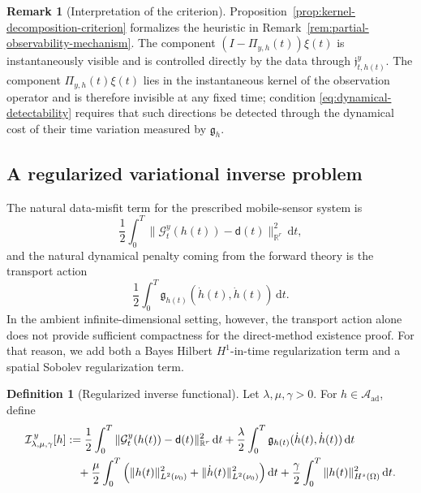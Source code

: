 \documentclass{article}
\theoremstyle{definition}
\newtheorem{definition}[theorem]{Definition}
\newtheorem{remark}[theorem]{Remark}
\renewcommand{\d}{\mathrm{d}}
\newcommand{\obsdata}{\mathsf{d}}
\begin{document}
\begin{remark}[Interpretation of the criterion]
    \label{rem:kernel-decomposition-criterion}
    Proposition~\ref{prop:kernel-decomposition-criterion} formalizes the heuristic in
    Remark~\ref{rem:partial-observability-mechanism}. The component
    \((I-\Pi_{y,h}(t))\xi(t)\) is instantaneously visible and is controlled directly by the data through
    \(\mathfrak j_{t,h(t)}^{y}\). The component \(\Pi_{y,h}(t)\xi(t)\) lies in the instantaneous kernel
    of the observation operator and is therefore invisible at any fixed time; condition
    \eqref{eq:dynamical-detectability} requires that such directions be detected through the dynamical
    cost of their time variation measured by \(\mathfrak g_h\).
\end{remark}

\subsection{A regularized variational inverse problem}
\label{subsec:regularized-variational-inverse}

The natural data-misfit term for the prescribed mobile-sensor system is
\[
    \frac12\int_0^T \|\mathcal G_t^y(h(t))-\obsdata(t)\|_{\mathbb R^r}^2\,\d t,
\]
and the natural dynamical penalty coming from the forward theory is the transport action
\[
    \frac12\int_0^T \mathfrak g_{h(t)}(\dot h(t),\dot h(t))\,\d t.
\]
In the ambient infinite-dimensional setting, however, the transport action alone does not provide
sufficient compactness for the direct-method existence proof. For that reason, we add both a
Bayes Hilbert \(H^1\)-in-time regularization term and a spatial Sobolev regularization term.

\begin{definition}[Regularized inverse functional]
    \label{def:ambient-inverse-functional}
    Let \(\lambda,\mu,\gamma>0\). For \(h\in\mathcal A_{\mathrm{ad}}\), define
    \begin{align}
        \label{eq:ambient-inverse-functional}
        \mathcal I_{\lambda,\mu,\gamma}^{\,y}[h]
         & :=
        \frac12\int_0^T \|\mathcal G_t^y(h(t))-\obsdata(t)\|_{\mathbb R^r}^2\,\d t
        +
        \frac{\lambda}{2}\int_0^T \mathfrak g_{h(t)}(\dot h(t),\dot h(t))\,\d t \notag \\
         & \quad
        +
        \frac{\mu}{2}\int_0^T
        \Big(
        \|h(t)\|_{L^2(\nu_0)}^2+\|\dot h(t)\|_{L^2(\nu_0)}^2
        \Big)\,\d t
        +
        \frac{\gamma}{2}\int_0^T \|h(t)\|_{H^s(\Omega)}^2\,\d t.
    \end{align}
\end{definition}
\end{document}

